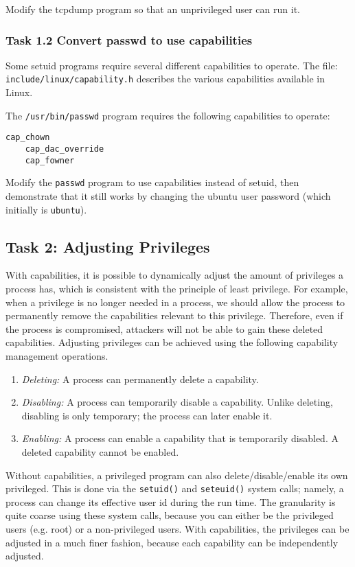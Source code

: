 Modify the tcpdump program so that an unprivileged user can run it.

\subsubsection{Task 1.2 Convert passwd to use capabilities}
Some setuid programs require several different capabilities
to operate.  The file: {\tt include/linux/capability.h}
describes the various capabilities available in Linux.

The \texttt{/usr/bin/passwd} program requires the following
capabilities to operate:

\begin{Verbatim}[frame=single] 
    cap_chown
    cap_dac_override
    cap_fowner
\end{Verbatim}

Modify the \texttt{passwd} program to use capabilities instead of setuid,
then demonstrate that it still works by changing the ubuntu user password
(which initially is \texttt{ubuntu}).


\subsection{Task 2: Adjusting Privileges}

With capabilities, it is possible to dynamically adjust the amount of privileges  
a process has, which is consistent with the principle of least privilege.
For example, when a privilege is no longer needed in a process,
we should allow the process to permanently remove the capabilities
relevant to this privilege. Therefore,
even if the process is compromised, attackers will not be able to
gain these deleted capabilities.
Adjusting privileges can be achieved using the following
capability management operations.
\begin{enumerate}
  \item {\em Deleting:}  A process can permanently delete a capability.
  \item {\em Disabling:} A process can temporarily disable a capability.
        Unlike deleting, disabling is only temporary; the process
        can later enable it.
  \item {\em Enabling:} A process can enable a capability that is temporarily disabled.
        A deleted capability cannot be enabled.
\end{enumerate}

Without capabilities, a privileged \setuid program can also
delete/disable/enable its own privileged. This is done via
the {\tt setuid()} and {\tt seteuid()} system calls; namely, a process
can change its effective user id during the run time. The
granularity is quite coarse using these system calls, because you can either
be the privileged users (e.g. root) or a non-privileged users.
With capabilities, the privileges can be adjusted in a much
finer fashion, because each capability can be independently adjusted.

